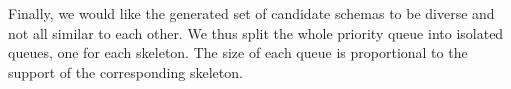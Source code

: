 %

Finally, we would like the generated set of candidate schemas
to be diverse and not all similar to each other.
We thus split the whole priority queue into isolated queues, one for each skeleton.
The size of each queue is proportional to the support of the corresponding
skeleton.





